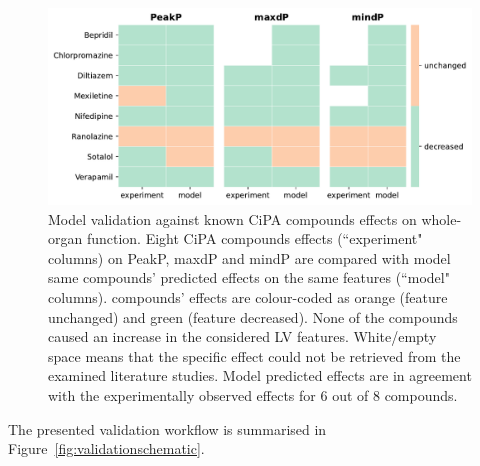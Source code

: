 \begin{figure}[!ht]
    \myfloatalign
    \includegraphics[width=1\textwidth]{figures/chapter06/model_vs_experiments.pdf}
    \caption{Model validation against known CiPA compounds effects on whole-organ function. Eight CiPA compounds effects (``experiment" columns) on PeakP, maxdP and mindP are compared with model same compounds' predicted effects on the same features (``model" columns). compounds' effects are colour-coded as orange (feature unchanged) and green (feature decreased). None of the compounds caused an increase in the considered LV features. White/empty space means that the specific effect could not be retrieved from the examined literature studies. Model predicted effects are in agreement with the experimentally observed effects for $6$ out of $8$ compounds.}
    \label{fig:validationtable}
\end{figure}

\vspace{0.2cm}\noindent
The presented validation workflow is summarised in Figure~\ref{fig:validationschematic}.

